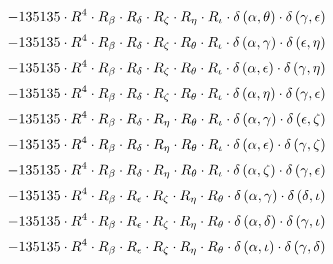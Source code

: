 \begin{subequations}
\begin{gather}
 \\[0.2em] \notag 		 - 135135 \cdot R^{4} \cdot R_{\beta{}} \cdot R_{\delta{}} \cdot R_{\zeta{}} \cdot R_{\eta{}} \cdot R_{\iota{}} \cdot \delta{}\left(\alpha{}, \theta{}\right) \cdot \delta{}\left(\gamma{}, \epsilon{}\right) 
 \\[0.2em] \notag 		 - 135135 \cdot R^{4} \cdot R_{\beta{}} \cdot R_{\delta{}} \cdot R_{\zeta{}} \cdot R_{\theta{}} \cdot R_{\iota{}} \cdot \delta{}\left(\alpha{}, \gamma{}\right) \cdot \delta{}\left(\epsilon{}, \eta{}\right) 
 \\[0.2em] \notag 		 - 135135 \cdot R^{4} \cdot R_{\beta{}} \cdot R_{\delta{}} \cdot R_{\zeta{}} \cdot R_{\theta{}} \cdot R_{\iota{}} \cdot \delta{}\left(\alpha{}, \epsilon{}\right) \cdot \delta{}\left(\gamma{}, \eta{}\right) 
 \\[0.2em] \notag 		 - 135135 \cdot R^{4} \cdot R_{\beta{}} \cdot R_{\delta{}} \cdot R_{\zeta{}} \cdot R_{\theta{}} \cdot R_{\iota{}} \cdot \delta{}\left(\alpha{}, \eta{}\right) \cdot \delta{}\left(\gamma{}, \epsilon{}\right) 
 \\[0.2em] \notag 		 - 135135 \cdot R^{4} \cdot R_{\beta{}} \cdot R_{\delta{}} \cdot R_{\eta{}} \cdot R_{\theta{}} \cdot R_{\iota{}} \cdot \delta{}\left(\alpha{}, \gamma{}\right) \cdot \delta{}\left(\epsilon{}, \zeta{}\right) 
 \\[0.2em] \notag 		 - 135135 \cdot R^{4} \cdot R_{\beta{}} \cdot R_{\delta{}} \cdot R_{\eta{}} \cdot R_{\theta{}} \cdot R_{\iota{}} \cdot \delta{}\left(\alpha{}, \epsilon{}\right) \cdot \delta{}\left(\gamma{}, \zeta{}\right) 
 \\[0.2em] \notag 		 - 135135 \cdot R^{4} \cdot R_{\beta{}} \cdot R_{\delta{}} \cdot R_{\eta{}} \cdot R_{\theta{}} \cdot R_{\iota{}} \cdot \delta{}\left(\alpha{}, \zeta{}\right) \cdot \delta{}\left(\gamma{}, \epsilon{}\right) 
 \\[0.2em] \notag 		 - 135135 \cdot R^{4} \cdot R_{\beta{}} \cdot R_{\epsilon{}} \cdot R_{\zeta{}} \cdot R_{\eta{}} \cdot R_{\theta{}} \cdot \delta{}\left(\alpha{}, \gamma{}\right) \cdot \delta{}\left(\delta{}, \iota{}\right) 
 \\[0.2em] \notag 		 - 135135 \cdot R^{4} \cdot R_{\beta{}} \cdot R_{\epsilon{}} \cdot R_{\zeta{}} \cdot R_{\eta{}} \cdot R_{\theta{}} \cdot \delta{}\left(\alpha{}, \delta{}\right) \cdot \delta{}\left(\gamma{}, \iota{}\right) 
 \\[0.2em] \notag 		 - 135135 \cdot R^{4} \cdot R_{\beta{}} \cdot R_{\epsilon{}} \cdot R_{\zeta{}} \cdot R_{\eta{}} \cdot R_{\theta{}} \cdot \delta{}\left(\alpha{}, \iota{}\right) \cdot \delta{}\left(\gamma{}, \delta{}\right) 

\end{gather}
\end{subequations}
